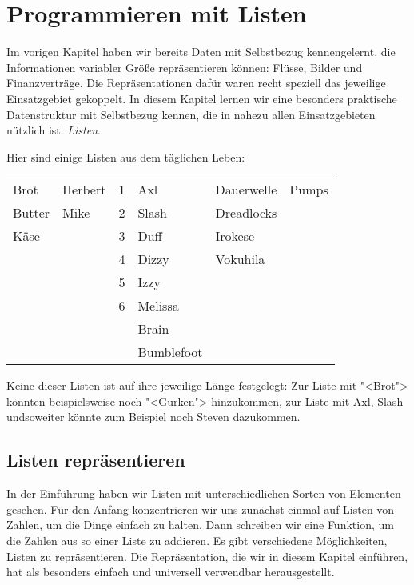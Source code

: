 
\chapter{Programmieren mit Listen}
\label{cha:rek}
\label{cha:list}

Im vorigen Kapitel haben wir bereits Daten mit Selbstbezug
kennengelernt, die Informationen variabler Größe repräsentieren
können: Flüsse, Bilder und Finanzverträge.  Die Repräsentationen dafür
waren recht speziell das jeweilige Einsatzgebiet gekoppelt.  In diesem
Kapitel lernen wir eine besonders praktische Datenstruktur mit
Selbstbezug kennen, die in nahezu allen Einsatzgebieten nützlich ist:
\textit{Listen}.

Hier sind einige Listen aus dem täglichen Leben:
%
\begin{center}
  \begin{tabular}{l@{\qquad}l@{\qquad}l@{\qquad}l@{\qquad}l@{\qquad}l}
  Brot & Herbert & 1 & Axl & Dauerwelle & Pumps \\
  Butter & Mike & 2 & Slash & Dreadlocks \\
  Käse & & 3 & Duff & Irokese \\
  & & 4 & Dizzy & Vokuhila \\
  && 5 & Izzy \\
  && 6 & Melissa \\
  &&& Brain\\
  &&& Bumblefoot 
\end{tabular}
\end{center}
%
Keine dieser Listen ist auf ihre jeweilige Länge festgelegt: Zur Liste
mit "<Brot"> könnten beispielsweise noch "<Gurken"> hinzukommen, zur
Liste mit Axl, Slash undsoweiter könnte zum Beispiel noch Steven
dazukommen.

\section{Listen repräsentieren}

In der Einführung haben wir Listen mit unterschiedlichen Sorten von
Elementen gesehen.  Für den Anfang konzentrieren wir uns zunächst
einmal auf Listen von Zahlen, um die Dinge einfach zu halten.  Dann
schreiben wir eine Funktion, um die Zahlen aus so einer Liste zu
addieren. Es gibt verschiedene Möglichkeiten, Listen zu
repräsentieren.  Die Repräsentation, die wir in diesem Kapitel
einführen, hat als besonders einfach und universell verwendbar
herausgestellt.

